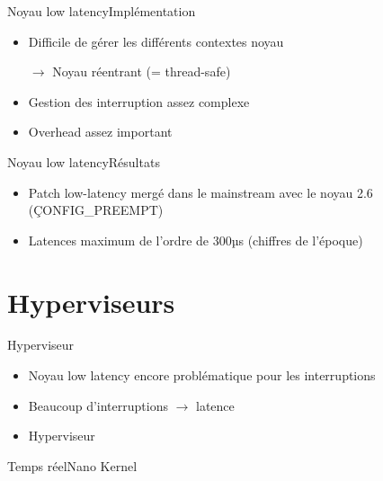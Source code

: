 \begin{frame}{Noyau low latency}{Implémentation}
  \begin{itemize}
  \item Difficile de gérer les différents contextes noyau
  \item[$\to$] Noyau réentrant (= thread-safe)
  \item Gestion des interruption assez complexe
  \item Overhead assez important
  \end{itemize}
\end{frame}

\begin{frame}{Noyau low latency}{Résultats}
  \begin{itemize}
  \item Patch low-latency  mergé dans le mainstream avec  le noyau 2.6
    (\c{CONFIG_PREEMPT})
  \item Latences maximum de l'ordre de 300µs (chiffres de l'époque)
  \end{itemize}
\end{frame}

\section{Hyperviseurs}

\begin{frame}{Hyperviseur}
  \begin{itemize}
  \item Noyau low latency encore problématique pour les interruptions
  \item Beaucoup d'interruptions $\to$ latence
  \item Hyperviseur
  \end{itemize}
\end{frame}

\begin{frame}{Temps réel}{Nano Kernel}
  \begin{center}
    
  \end{center}
\end{frame}


